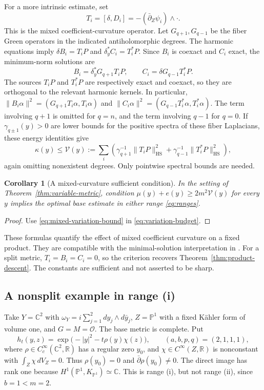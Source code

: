 \documentclass[11pt,reqno]{amsart}
\numberwithin{equation}{section}
\newtheorem{corollary}[theorem]{Corollary}
\theoremstyle{definition}
\theoremstyle{remark}
\newcommand{\db}{\bar\partial}
\newcommand{\C}{\mathbb C}
\newcommand{\cO}{\mathcal O}
\begin{document}
For a more intrinsic estimate, set
\[
 T_i=[\delta,D_i]=-(\db_Z\psi_i)\wedge\cdot.
\]
This is the mixed coefficient-curvature operator. Let $G_{q+1},G_{q-1}$ be the fiber Green operators in the indicated antiholomorphic degrees. The harmonic equations imply
$\delta B_i=T_iP$ and $\delta_y^*C_i=T_i^*P$. Since $B_i$ is coexact and $C_i$ exact, the minimum-norm solutions are
\begin{equation}\label{eq:mixed-green-variation}
 B_i=\delta_y^*G_{q+1}T_iP,
 \qquad C_i=\delta G_{q-1}T_i^*P.
\end{equation}
The sources $T_iP$ and $T_i^*P$ are respectively exact and coexact, so they are orthogonal to the relevant harmonic kernels. In particular,
$\|B_i\alpha\|^2=(G_{q+1}T_i\alpha,T_i\alpha)$ and
$\|C_i\alpha\|^2=(G_{q-1}T_i^*\alpha,T_i^*\alpha)$.
The term involving $q+1$ is omitted for $q=n$, and the term involving $q-1$ for $q=0$. If $\gamma_{q\pm1}(y)>0$ are lower bounds for the positive spectra of these fiber Laplacians, these energy identities give
\begin{equation}\label{eq:mixed-variation-bound}
 \kappa(y)\leq \mathcal V(y):=
 \sum_i\left(
   \gamma_{q+1}^{-1}\|T_iP\|_{\mathrm{HS}}^2
   +\gamma_{q-1}^{-1}\|T_i^*P\|_{\mathrm{HS}}^2\right),
\end{equation}
again omitting nonexistent degrees. Only pointwise spectral bounds are needed.

\begin{corollary}[A mixed-curvature sufficient condition]\label{cor:mixed-extension}
In the setting of Theorem~\ref{thm:variable-metric}, condition
$\mu(y)+e(y)\geq2m^2\mathcal V(y)$ for every $y$ implies the optimal base estimate in either range \eqref{eq:ranges}.
\end{corollary}
\begin{proof}
Use \eqref{eq:mixed-variation-bound} in \eqref{eq:variation-budget}.
\end{proof}
These formulas quantify the effect of mixed coefficient curvature on a fixed product. They are compatible with the minimal-solution interpretation in \cite[Section 7]{CS24}. For a split metric, $T_i=B_i=C_i=0$, so the criterion recovers Theorem~\ref{thm:product-descent}. The constants are sufficient and not asserted to be sharp.

\subsection{A nonsplit example in range (i)}
Take $Y=\C^2$ with $\omega_Y=i\sum_{j=1}^2dy_j\wedge d\bar y_j$, $Z=\mathbb P^1$ with a fixed K\"ahler form of volume one, and $G=M=\cO$. The base metric is complete. Put
\begin{equation}\label{eq:nonsplit-example}
 h_t(y,z)=\exp\bigl(-|y|^2-t\rho(y)\chi(z)\bigr),\qquad
 (a,b,p,q)=(2,1,1,1),
\end{equation}
where $\rho\in C_c^\infty(\C^2,\mathbb R)$ has a regular zero $y_0$, and $\chi\in C^\infty(Z,\mathbb R)$ is nonconstant with $\int_Z\chi\,dV_Z=0$. Thus $\rho(y_0)=0$ and $\db\rho(y_0)\ne0$. The direct image has rank one because $H^1(\mathbb P^1,K_{\mathbb P^1})\simeq\C$. This is range (i), but not range (ii), since $b=1<m=2$.
\end{document}
